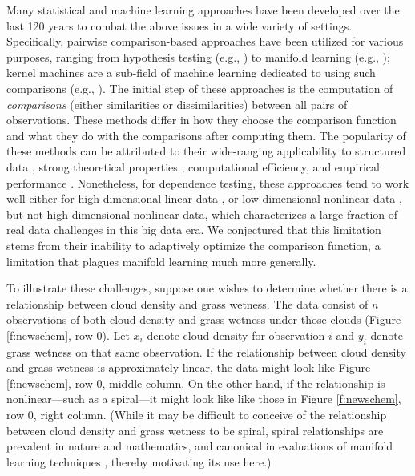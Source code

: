 \documentclass[11pt]{article}
\begin{document}
Many statistical and machine learning approaches have been developed over the last 120 years to combat the above issues in a wide variety of  settings. Specifically, pairwise comparison-based approaches have been utilized  for various purposes, ranging from hypothesis testing (e.g., \cite{David1966,Mantel1967,Friedman1983,Schilling1986,Maa1996,SzekelyRizzo2009,SzekelyRizzo2013b,HellerGorfine2013,Dumcke2014}) 
to manifold learning (e.g., \cite{TorgersonBook, TenenbaumSilvaLangford2000, SaulRoweis2000, BelkinNiyogi2003,DiffusionPNAS, MMS:NoisyDictionaryLearning}); kernel machines are a sub-field of machine learning dedicated to using such comparisons (e.g., \cite{scholkopf2002learning,GrettonEtAl2005,harchaoui2013kernel}).
The initial step of these approaches is the computation of \emph{comparisons} (either  similarities or dissimilarities) between all pairs of observations.
These methods differ in how they choose the comparison function and what they do with the comparisons after computing them. 
The popularity of these methods can be attributed to their wide-ranging applicability to structured data \cite{scholkopf2002learning}, strong theoretical properties \cite{SilvaTenenbaum2002,Allard2012}, computational efficiency, and empirical performance \cite{lu2014scale}.
Nonetheless, for dependence testing, these approaches tend to work well either for high-dimensional linear data \cite{SzekelyRizzo2013a}, or low-dimensional nonlinear data \cite{heller2016consistent}, but not high-dimensional nonlinear data, which characterizes a large fraction of real data challenges in this big data era. We conjectured that this limitation stems from their inability 
to adaptively optimize the comparison function, a limitation that plagues manifold learning much more generally.



To illustrate these challenges,
suppose one wishes to determine whether there is a relationship between cloud density and grass wetness. The data consist of $n$ observations of both cloud density and grass wetness under those clouds (Figure \ref{f:newschem}, row 0).
Let $x_i$ denote cloud density for observation $i$ and $y_i$ denote grass wetness on that same observation. 
If the relationship between cloud density and grass wetness is approximately linear, the data might look like Figure \ref{f:newschem}, row 0, middle column. 
On the other hand, if the relationship is nonlinear---such as a  spiral---it might look like
like those in Figure \ref{f:newschem}, row 0, right column.
(While it may be difficult to conceive of the relationship between cloud density and grass wetness to be spiral, spiral relationships are prevalent in nature and mathematics, and canonical in evaluations of manifold learning techniques \cite{Lee07a}, thereby motivating its use here.)
\end{document}
